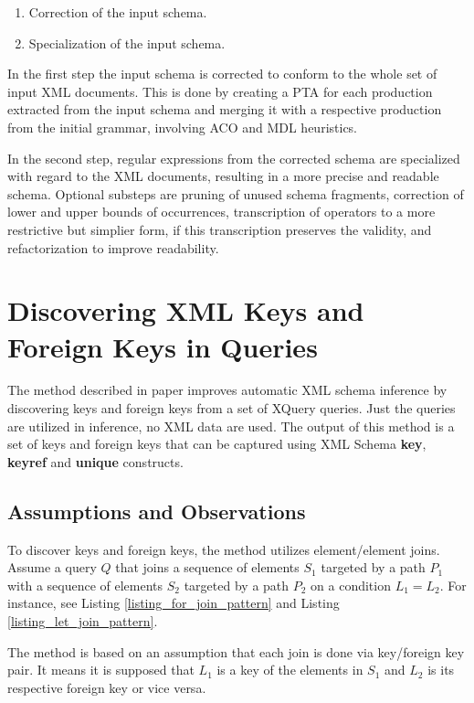 \begin{enumerate}
\item Correction of the input schema.
\item Specialization of the input schema.
\end{enumerate}

In the first step the input schema is corrected to conform to the whole set of input XML documents. This is done by creating a PTA for each production extracted from the input schema and merging it with a respective production from the initial grammar, involving ACO and MDL heuristics.

In the second step, regular expressions from the corrected schema are specialized with regard to the XML documents, resulting in a more precise and readable schema. Optional substeps are pruning of unused schema fragments, correction of lower and upper bounds of occurrences, transcription of operators to a more restrictive but simplier form, if this transcription preserves the validity, and refactorization to improve readability.

\section{Discovering XML Keys and Foreign Keys in Queries}\label{Keys}
The method described in paper \cite{Necasky:2009:DXK:1529282.1529414} improves automatic XML schema inference by discovering keys and foreign keys from a set of XQuery queries. Just the queries are utilized in inference, no XML data are used. The output of this method is a set of keys and foreign keys that can be captured using XML Schema \textbf{key}, \textbf{keyref} and \textbf{unique} constructs.

\subsection{Assumptions and Observations}
To discover keys and foreign keys, the method utilizes element/element joins. Assume a query $Q$ that joins a sequence of elements $S_1$ targeted by a path $P_1$ with a sequence of elements $S_2$ targeted by a path $P_2$ on a condition $L_1 = L_2$. For instance, see Listing \ref{listing_for_join_pattern} and Listing \ref{listing_let_join_pattern}.

The method is based on an assumption that each join is done via key/foreign key pair. It means it is supposed that $L_1$ is a key of the elements in $S_1$ and $L_2$ is its respective foreign key or vice versa.

